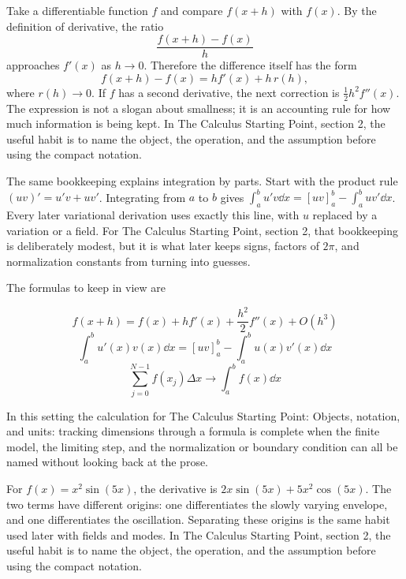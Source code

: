 Take a differentiable function \(f\) and compare \(f(x+h)\) with \(f(x)\).  By the definition of derivative, the ratio
\[
  \frac{f(x+h)-f(x)}{h}
\]
approaches \(f'(x)\) as \(h\to0\).  Therefore the difference itself has the form
\[
  f(x+h)-f(x)=hf'(x)+h\,r(h),
\]
where \(r(h)\to0\).  If \(f\) has a second derivative, the next correction is \(\frac12h^2f''(x)\).  The expression is not a slogan about smallness; it is an accounting rule for how much information is being kept.  In The Calculus Starting Point, section 2, the useful habit is to name the object, the operation, and the assumption before using the compact notation.

The same bookkeeping explains integration by parts.  Start with the product rule \((uv)'=u'v+uv'\).  Integrating from \(a\) to \(b\) gives \(\int_a^b u'v\dd x=[uv]_a^b-\int_a^buv'\dd x\).  Every later variational derivation uses exactly this line, with \(u\) replaced by a variation or a field.  For The Calculus Starting Point, section 2, that bookkeeping is deliberately modest, but it is what later keeps signs, factors of \(2\pi\), and normalization constants from turning into guesses.

The formulas to keep in view are

\[
  f(x+h)=f(x)+hf'(x)+\frac{h^2}{2}f''(x)+O(h^3)
\]
\[
  \int_a^b u'(x)v(x)\dd x=[uv]_a^b-\int_a^b u(x)v'(x)\dd x
\]
\[
  \sum_{j=0}^{N-1}f(x_j)\Delta x\longrightarrow \int_a^b f(x)\dd x
\]

In this setting the calculation for The Calculus Starting Point: Objects, notation, and units: tracking dimensions through a formula is complete when the finite model, the limiting step, and the normalization or boundary condition can all be named without looking back at the prose.




\begin{example}
For \(f(x)=x^2\sin(5x)\), the derivative is \(2x\sin(5x)+5x^2\cos(5x)\).  The two terms have different origins: one differentiates the slowly varying envelope, and one differentiates the oscillation.  Separating these origins is the same habit used later with fields and modes.  In The Calculus Starting Point, section 2, the useful habit is to name the object, the operation, and the assumption before using the compact notation.
\end{example}



